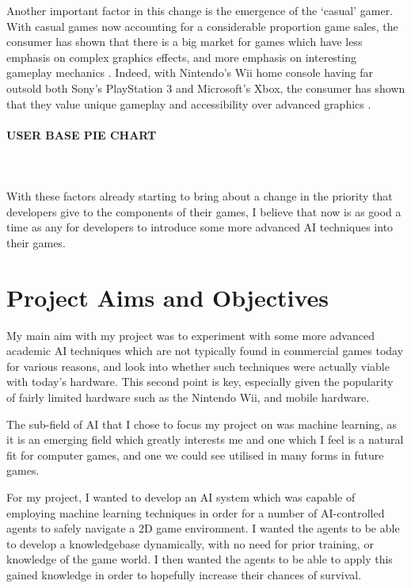 \documentclass[a4paper,oneside]{report}
\begin{document}
Another important factor in this change is the emergence of the `casual' gamer. With casual games now accounting for a considerable proportion game sales, the consumer has shown that there is a big market for games which have less emphasis on complex graphics effects, and more emphasis on interesting gameplay mechanics \cite{Association:2011uq}. Indeed, with Nintendo's Wii home console having far outsold both Sony's PlayStation 3 and Microsoft's Xbox, the consumer has shown that they value unique gameplay and accessibility over advanced graphics \cite{:2012dq, Nintendo:2012nx, :cr}. 

\paragraph{USER BASE PIE CHART}\ \\ \\

With these factors already starting to bring about a change in the priority that developers give to the components of their games, I believe that now is as good a time as any for developers to introduce some more advanced AI techniques into their games.

\section{Project Aims and Objectives}

My main aim with my project was to experiment with some more advanced academic AI techniques which are not typically found in commercial games today for various reasons, and look into whether such techniques were actually viable with today's hardware. This second point is key, especially given the popularity of fairly limited hardware such as the Nintendo Wii, and mobile hardware.

The sub-field of AI that I chose to focus my project on was machine learning, as it is an emerging field which greatly interests me and one which I feel is a natural fit for computer games, and one we could see utilised in many forms in future games.

For my project, I wanted to develop an AI system which was capable of employing machine learning techniques in order for a number of AI-controlled agents to safely navigate a 2D game environment. I wanted the agents to be able to develop a knowledgebase dynamically, with no need for prior training, or knowledge of the game world. I then wanted the agents to be able to apply this gained knowledge in order to hopefully increase their chances of survival. 
\end{document}
